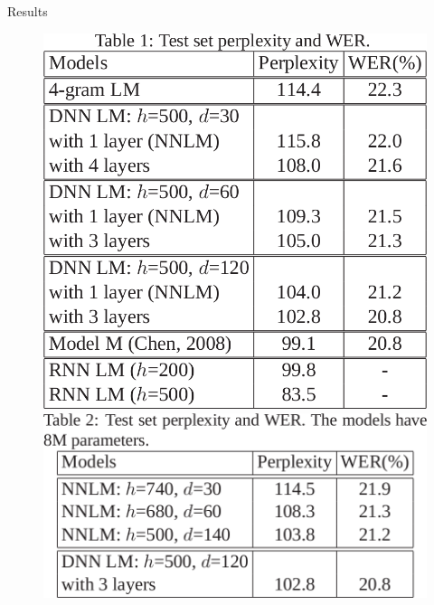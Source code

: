 \documentclass{beamer}
\begin{document}
\begin{frame}{Results}
	\begin{figure}[!htb]
		\centering
			\begin{minipage}{0.45\textwidth}
				    \includegraphics[width=\linewidth]{./images/results2.png}
			\end{minipage}
			\hspace{5mm}
			\begin{minipage}{0.45\textwidth}
				    \includegraphics[width=\linewidth]{./images/results3.png}
			\end{minipage}
	\end{figure}
\end{frame}
\end{document}
